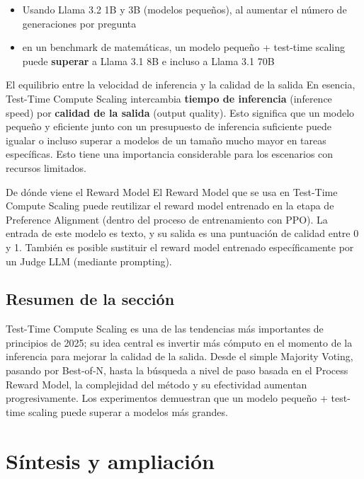 \documentclass[a4paper]{article}
\begin{document}
\begin{itemize}
    \item Usando Llama 3.2 1B y 3B (modelos pequeños), al aumentar el número de generaciones por pregunta
    \item en un benchmark de matemáticas, un modelo pequeño + test-time scaling puede \textbf{superar} a Llama 3.1 8B e incluso a Llama 3.1 70B
\end{itemize}

\begin{importantbox}{El equilibrio entre la velocidad de inferencia y la calidad de la salida}
En esencia, Test-Time Compute Scaling intercambia \textbf{tiempo de inferencia} (inference speed) por \textbf{calidad de la salida} (output quality). Esto significa que un modelo pequeño y eficiente junto con un presupuesto de inferencia suficiente puede igualar o incluso superar a modelos de un tamaño mucho mayor en tareas específicas. Esto tiene una importancia considerable para los escenarios con recursos limitados.
\end{importantbox}

\begin{knowledgebox}{De dónde viene el Reward Model}
El Reward Model que se usa en Test-Time Compute Scaling puede reutilizar el reward model entrenado en la etapa de Preference Alignment (dentro del proceso de entrenamiento con PPO). La entrada de este modelo es texto, y su salida es una puntuación de calidad entre 0 y 1. También es posible sustituir el reward model entrenado específicamente por un Judge LLM (mediante prompting).
\end{knowledgebox}

\subsection{Resumen de la sección}

Test-Time Compute Scaling es una de las tendencias más importantes de principios de 2025; su idea central es invertir más cómputo en el momento de la inferencia para mejorar la calidad de la salida. Desde el simple Majority Voting, pasando por Best-of-N, hasta la búsqueda a nivel de paso basada en el Process Reward Model, la complejidad del método y su efectividad aumentan progresivamente. Los experimentos demuestran que un modelo pequeño + test-time scaling puede superar a modelos más grandes.

\newpage
\section{Síntesis y ampliación}
\end{document}
